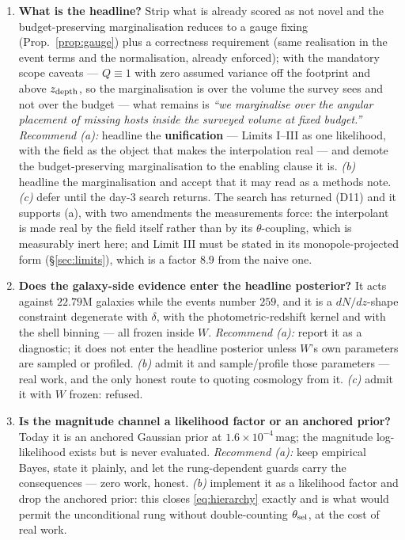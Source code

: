 \documentclass[11pt]{article}
\theoremstyle{definition}
\theoremstyle{remark}
\newcommand{\zdep}{z_{\rm depth}}
\begin{document}
\begin{enumerate}[leftmargin=2.0em,itemsep=3pt]
\item[\bf D12.] \textbf{What is the headline?} Strip what is already scored as not
novel and the budget-preserving marginalisation reduces to a gauge fixing
(Prop.~\ref{prop:gauge}) plus a correctness requirement (same realisation in the event
terms and the normalisation, already enforced); with the mandatory scope caveats ---
$Q\equiv1$ with zero assumed variance off the footprint and above $\zdep$, so the
marginalisation is over the volume the survey sees and not over the budget --- what
remains is \emph{``we marginalise over the angular placement of missing hosts inside
the surveyed volume at fixed budget.''} \emph{Recommend (a):} headline the
\textbf{unification} --- Limits I--III as one likelihood, with the field as the
object that makes the interpolation real --- and demote the budget-preserving
marginalisation to the enabling clause it is. \emph{(b)} headline
the marginalisation and accept that it may read as a methods note. \emph{(c)} defer
until the day-3 search returns. The search has returned (D11) and it supports (a),
with two amendments the measurements force: the interpolant is made real by the
field itself rather than by its $\theta$-coupling, which is measurably inert here;
and Limit III must be stated in its monopole-projected form (\S\ref{sec:limits}),
which is a factor $8.9$ from the naive one.

\item[\bf D13.] \textbf{Does the galaxy-side evidence enter the headline posterior?}
It acts against $22.79$M galaxies while the events number $259$, and it is a
$dN/dz$-shape constraint degenerate with $\delta$, with the photometric-redshift
kernel and with the shell binning --- all frozen inside $W$. \emph{Recommend (a):}
report it as a diagnostic; it does not enter the headline posterior unless $W$'s own
parameters are sampled or profiled. \emph{(b)} admit it and sample/profile those
parameters --- real work, and the only honest route to quoting cosmology from it.
\emph{(c)} admit it with $W$ frozen: refused.

\item[\bf D14.] \textbf{Is the magnitude channel a likelihood factor or an anchored
prior?} Today it is an anchored Gaussian prior at $1.6\times10^{-4}$\,mag; the
magnitude log-likelihood exists but is never evaluated. \emph{Recommend (a):} keep
empirical Bayes, state it plainly, and let the rung-dependent guards carry the
consequences --- zero work, honest. \emph{(b)} implement it as a likelihood factor and
drop the anchored prior: this closes \eqref{eq:hierarchy} exactly and is what would
permit the unconditional rung without double-counting $\theta_{\rm sel}$, at the cost
of real work.

\end{enumerate}
\end{document}
